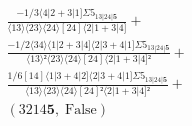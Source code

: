 \documentclass[varwidth, border=5pt]{standalone}
\begin{document}
\begin{my}
$\begin{gathered}
\scriptscriptstyle\frac{-1/3⟨4|2+3|1]Σ5_{13|24|𝟓}}{⟨13⟩⟨23⟩⟨24⟩[24]⟨2|1+3|4]} +\\
\scriptscriptstyle\frac{-1/2⟨34⟩⟨1|2+3|4]⟨2|3+4|1]Σ5_{13|24|𝟓}}{⟨13⟩²⟨23⟩⟨24⟩[24]⟨2|1+3|4]²} +\\
\scriptscriptstyle\frac{1/6[14]⟨1|3+4|2]⟨2|3+4|1]Σ5_{13|24|𝟓}}{⟨13⟩⟨23⟩⟨24⟩[24]²⟨2|1+3|4]²} +\\
\scriptscriptstyle(3214𝟓,\;\text{False}) \phantom{+}
\end{gathered}$
\end{my}
\end{document}
